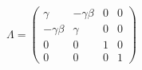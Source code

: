 

\vspace*{\fill}
\centering

\begin{align*}
   \Lambda = 
   \begin{pmatrix}
   \gamma & -\gamma \beta & 0 & 0 \\
   -\gamma\beta & \gamma & 0 & 0 \\
   0 & 0 & 1 & 0 \\
   0 & 0 & 0 & 1
   \end{pmatrix}
\end{align*}

\centering
\vspace*{\fill}

